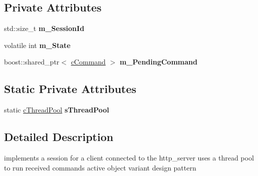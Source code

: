 \subsection*{Private Attributes}
\begin{DoxyCompactItemize}
\item 
\hypertarget{classengine_1_1cSession_af7dc53c09799a31677b47a66ca5121ce}{std\-::size\-\_\-t {\bfseries m\-\_\-\-Session\-Id}}\label{classengine_1_1cSession_af7dc53c09799a31677b47a66ca5121ce}

\item 
\hypertarget{classengine_1_1cSession_af0edf0e0ced62ee7e8a5136637cc0084}{volatile int {\bfseries m\-\_\-\-State}}\label{classengine_1_1cSession_af0edf0e0ced62ee7e8a5136637cc0084}

\item 
\hypertarget{classengine_1_1cSession_a59de0ebf700a8c59634cc12f29f746b3}{boost\-::shared\-\_\-ptr$<$ \hyperlink{classengine_1_1cCommand}{c\-Command} $>$ {\bfseries m\-\_\-\-Pending\-Command}}\label{classengine_1_1cSession_a59de0ebf700a8c59634cc12f29f746b3}

\end{DoxyCompactItemize}
\subsection*{Static Private Attributes}
\begin{DoxyCompactItemize}
\item 
\hypertarget{classengine_1_1cSession_a2f0a00f5302fdf8d88d4738c448ce4fa}{static \hyperlink{classengine_1_1cThreadPool}{c\-Thread\-Pool} {\bfseries s\-Thread\-Pool}}\label{classengine_1_1cSession_a2f0a00f5302fdf8d88d4738c448ce4fa}

\end{DoxyCompactItemize}


\subsection{Detailed Description}
implements a session for a client connected to the http\-\_\-server uses a thread pool to run received commands active object variant design pattern 

